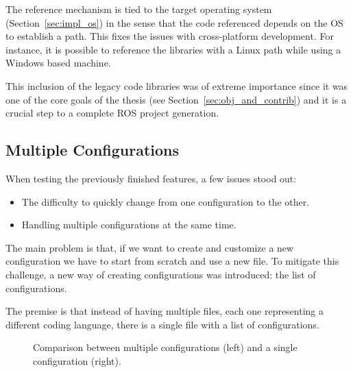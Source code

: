 The reference mechanism is tied to the target operating system (Section~\ref{sec:impl_os}) in the sense that the code referenced depends on the \gls{OS} to establish a path. This fixes the issues with cross-platform development. For instance, it is possible to reference the libraries with a Linux path while using a Windows based machine. 

This inclusion of the legacy code libraries was of extreme importance since it was one of the core goals of the thesis (see Section~\ref{sec:obj_and_contrib}) and it is a crucial step to a complete \gls{ROS} project generation.

\newpage

\subsection{Multiple Configurations}
\label{sec:impl_multi_config}

When testing the previously finished features, a few issues stood out: 

\begin{itemize} 
	\item The difficulty to quickly change from one configuration to the other.
	\item Handling multiple configurations at the same time.
\end{itemize}

The main problem is that, if we want to create and customize a new configuration we have to start from scratch and use a new file. To mitigate this challenge, a new way of creating configurations was introduced: the list of configurations.

The premise is that instead of having multiple files, each one representing a different coding language, there is a single file with a list of configurations.

\begin{figure}[h]
	\centering
{}
\hspace{1cm}
\caption{Comparison between multiple configurations (left) and a single configuration (right).}
\label{fig:tree_config_comparison}
\end{figure}


